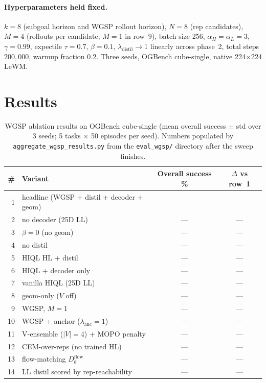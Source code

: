 \paragraph{Hyperparameters held fixed.}
$k=8$ (subgoal horizon and WGSP rollout horizon),
$N=8$ (rep candidates), $M=4$ (rollouts per candidate; $M{=}1$ in
row~9), batch size 256, $\alpha_H=\alpha_L=3$, $\gamma=0.99$,
expectile $\tau=0.7$, $\beta=0.1$, $\lambda_\text{distil}\!\to\!1$
linearly across phase~2, total steps $200{,}000$, warmup fraction
$0.2$. Three seeds, OGBench cube-single, native 224$\times$224 LeWM.

\section{Results}
\label{sec:wgsp:results}

\begin{table}[t]
\centering
\caption{WGSP ablation results on OGBench cube-single (mean overall
success $\pm$ std over 3 seeds; 5 tasks $\times$ 50 episodes per seed).
Numbers populated by \texttt{aggregate\_wgsp\_results.py} from the
\texttt{eval\_wgsp/} directory after the sweep finishes.}
\label{tab:wgsp-results}
\begin{tabular}{rlcc}
\toprule
\# & Variant & Overall success \% & $\Delta$ vs row~1 \\
\midrule
1  & headline (WGSP + distil + decoder + geom) & --- & --- \\
2  & no decoder (25D LL)              & --- & --- \\
3  & $\beta=0$ (no geom)              & --- & --- \\
4  & no distil                        & --- & --- \\
5  & HIQL HL + distil                 & --- & --- \\
6  & HIQL + decoder only              & --- & --- \\
7  & vanilla HIQL (25D LL)            & --- & --- \\
8  & geom-only ($V$ off)              & --- & --- \\
9  & WGSP, $M=1$                      & --- & --- \\
10 & WGSP + anchor ($\lambda_\text{anc}=1$) & --- & --- \\
\midrule
11 & V-ensemble ($|V|{=}4$) + MOPO penalty & --- & --- \\
12 & CEM-over-reps (no trained HL)    & --- & --- \\
13 & flow-matching $D^\text{flow}_\theta$ & --- & --- \\
14 & LL distil scored by rep-reachability & --- & --- \\
\bottomrule
\end{tabular}
\end{table}

